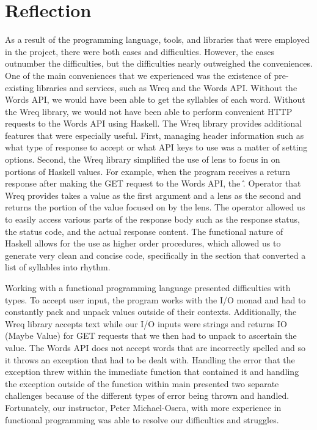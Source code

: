 \documentclass[11pt]{sigplanconf}
\begin{document}
\section{Reflection}

As a result of the programming language, tools, and libraries that were employed in the project, there were both eases and difficulties. However, the eases outnumber the difficulties, but the difficulties nearly outweighed the conveniences.\\

One of the main conveniences that we experienced was the existence of pre-existing libraries and services, such as Wreq and the Words API. Without the Words API, we would have been able to get the syllables of each word. Without the Wreq library, we would not have been able to perform convenient HTTP requests to the Words API using Haskell. The Wreq library provides additional features that were especially useful. First, managing header information such as what type of response to accept or what API keys to use was a matter of setting options. Second, the Wreq library simplified the use of lens to focus in on portions of Haskell values. For example, when the program receives a return response after making the GET request to the Words API, the \^. Operator that Wreq provides takes a value as the first argument and a lens as the second and returns the portion of the value focused on by the lens. The operator allowed us to easily access various parts of the response body such as the response status, the status code, and the actual response content. The functional nature of Haskell allows for the use as higher order procedures, which allowed us to generate very clean and concise code, specifically in the section that converted a list of syllables into rhythm.

Working with a functional programming language presented difficulties with types. To accept user input, the program works with the I/O monad and had to constantly pack and unpack values outside of their contexts. Additionally, the Wreq library accepts text while our I/O inputs were strings and returns IO (Maybe Value) for GET requests that we then had to unpack to ascertain the value. The Words API does not accept words that are incorrectly spelled and so it throws an exception that had to be dealt with. Handling the error that the exception threw within the immediate function that contained it and handling the exception outside of the function within main presented two separate challenges because of the different types of error being thrown and handled. Fortunately, our instructor, Peter Michael-Osera, with more experience in functional programming was able to resolve our difficulties and struggles.
\end{document}
